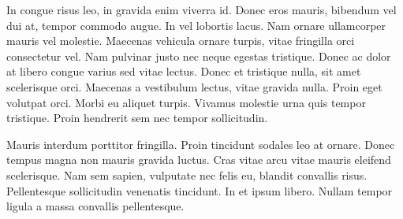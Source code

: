 \documentclass{article}
\begin{document}
\begin{question}
  In congue risus leo, in gravida enim viverra id. Donec eros mauris, bibendum vel dui at, tempor commodo augue. In vel lobortis lacus. Nam ornare ullamcorper mauris vel molestie. Maecenas vehicula ornare turpis, vitae fringilla orci consectetur vel. Nam pulvinar justo nec neque egestas tristique. Donec ac dolor at libero congue varius sed vitae lectus. Donec et tristique nulla, sit amet scelerisque orci. Maecenas a vestibulum lectus, vitae gravida nulla. Proin eget volutpat orci. Morbi eu aliquet turpis. Vivamus molestie urna quis tempor tristique. Proin hendrerit sem nec tempor sollicitudin.
\end{question}

Mauris interdum porttitor fringilla. Proin tincidunt sodales leo at ornare. Donec tempus magna non mauris gravida luctus. Cras vitae arcu vitae mauris eleifend scelerisque. Nam sem sapien, vulputate nec felis eu, blandit convallis risus. Pellentesque sollicitudin venenatis tincidunt. In et ipsum libero. Nullam tempor ligula a massa convallis pellentesque.
\end{document}
